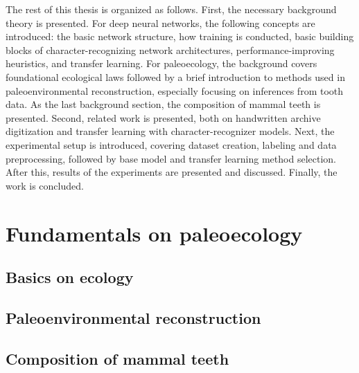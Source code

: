 \documentclass{article}
\begin{document}
The rest of this thesis is organized as follows. First, the necessary background theory is 
presented. For deep neural networks, the following concepts are introduced:
the basic network structure, how training is conducted, basic building blocks of character-recognizing network architectures, performance-improving 
heuristics, and transfer learning. For paleoecology, the background covers 
foundational ecological laws followed by a brief introduction to methods used in
paleoenvironmental reconstruction, especially focusing on inferences from tooth data.
As the last background section, the composition of mammal teeth is presented. 
Second, related work is presented, both on
handwritten archive digitization and transfer learning with character-recognizer models.
Next, the experimental setup is introduced, covering dataset creation, labeling and data 
preprocessing, followed by base model and transfer learning method selection. After this, 
results of the experiments are presented and discussed. Finally, the work is concluded.

\section{Fundamentals on paleoecology}

\subsection{Basics on ecology}

\subsection{Paleoenvironmental reconstruction}

\subsection{Composition of mammal teeth}
\label{sect:mammal_teeth}

\end{document}
